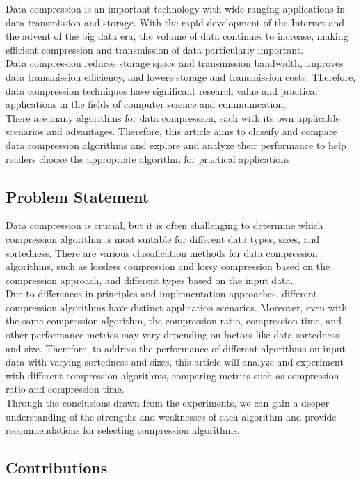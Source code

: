 \documentclass[sigconf]{acmart}
\begin{document}
    Data compression is an important technology with wide-ranging applications in data transmission and storage. With the rapid development of the Internet and the advent of the big data era, the volume of data continues to increase, making efficient compression and transmission of data particularly important. \\
    Data compression reduces storage space and transmission bandwidth, improves data transmission efficiency, and lowers storage and transmission costs. Therefore, data compression techniques have significant research value and practical applications in the fields of computer science and communication. \\
    There are many algorithms for data compression, each with its own applicable scenarios and advantages. Therefore, this article aims to classify and compare data compression algorithms and explore and analyze their performance to help readers choose the appropriate algorithm for practical applications.

\subsection{Problem Statement}

    Data compression is crucial, but it is often challenging to determine which compression algorithm is most suitable for different data types, sizes, and sortedness. There are various classification methods for data compression algorithms, such as lossless compression and lossy compression based on the compression approach, and different types based on the input data. \\
    Due to differences in principles and implementation approaches, different compression algorithms have distinct application scenarios. Moreover, even with the same compression algorithm, the compression ratio, compression time, and other performance metrics may vary depending on factors like data sortedness and size. Therefore, to address the performance of different algorithms on input data with varying sortedness and sizes, this article will analyze and experiment with different compression algorithms, comparing metrics such as compression ratio and compression time. \\
    Through the conclusions drawn from the experiments, we can gain a deeper understanding of the strengths and weaknesses of each algorithm and provide recommendations for selecting compression algorithms.

\subsection{Contributions}
\end{document}

